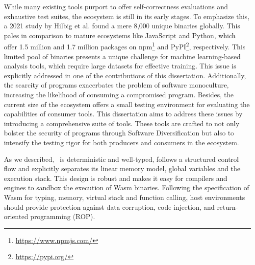  \cite{wasmixer} \cite{wobfuscator} 



While many existing tools purport to offer self-correctness evaluations and exhaustive test suites, the \Wasm ecosystem is still in its early stages. 
To emphasize this, a 2021 study by Hilbig et al.\cite{Hilbig2021AnES} found a mere 8,000 unique \Wasm binaries globally. 
This pales in comparison to mature ecosystems like JavaScript and Python, which offer 1.5 million and 1.7 million packages on npm\footnote{\url{https://www.npmjs.com/}} and PyPI\footnote{\url{https://pypi.org/}}, respectively.
This limited pool of \Wasm binaries presents a unique challenge for machine learning-based analysis tools, which require large datasets for effective training. 
This issue is explicitly addressed in one of the contributions of this dissertation\cite{EVASION}.
Additionally, the scarcity of \Wasm programs exacerbates the problem of software monoculture, increasing the likelihood of consuming a compromised \Wasm program\cite{YourCitationHere}.
Besides, the current size of the \Wasm ecosystem offers a small testing environment for evaluating the capabilities of consumer tools.
This dissertation aims to address these issues by introducing a comprehensive suite of tools. 
These tools are crafted to not only bolster the security of \Wasm programs through Software Diversification but also to intensify the testing rigor for both producers and consumers in the ecosystem.




As we described, \wasm\ is deterministic and well-typed, follows a structured control flow and explicitly separates its linear memory model, global variables and the execution stack. This design is robust \cite{WebAssemblySecurity} and makes it easy for compilers and engines to sandbox the execution of Wasm  binaries. Following the specification of Wasm  for typing, memory, virtual stack and function calling,
host environments should provide protection against data corruption, code injection, and return-oriented programming (ROP).

